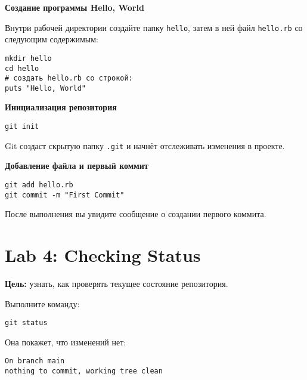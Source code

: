 \documentclass[a4paper,12pt]{report}
\begin{document}
\textbf{Создание программы Hello, World}

Внутри рабочей директории создайте папку \texttt{hello}, затем в ней файл \texttt{hello.rb} со следующим содержимым:

\begin{verbatim}
mkdir hello
cd hello
# создать hello.rb со строкой:
puts "Hello, World"
\end{verbatim}


\textbf{Инициализация репозитория}

\begin{verbatim}
git init
\end{verbatim}

Git создаст скрытую папку \texttt{.git} и начнёт отслеживать изменения в проекте.


\textbf{Добавление файла и первый коммит}

\begin{verbatim}
git add hello.rb
git commit -m "First Commit"
\end{verbatim}

После выполнения вы увидите сообщение о создании первого коммита.


\section{Lab 4: Checking Status}
\textbf{Цель:} узнать, как проверять текущее состояние репозитория.

Выполните команду:
\begin{verbatim}
git status
\end{verbatim}

Она покажет, что изменений нет:
\begin{verbatim}
On branch main
nothing to commit, working tree clean
\end{verbatim}
\end{document}
